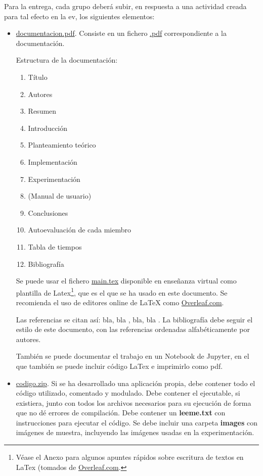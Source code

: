 \documentclass[a4paper]{article}
\begin{document}
Para la entrega, cada grupo deberá subir, en respuesta a una actividad creada para tal efecto en la ev, los siguientes elementos:

 \begin{itemize}
\item \url{documentacion.pdf}. Consiste en un fichero \url{.pdf} correspondiente a la documentación. 

Estructura de la documentación:

\begin{enumerate}
\item[]  Título
\item[]  Autores
\item[]  Resumen
\item  Introducción 
\item  Planteamiento teórico 
\item  Implementación
\item  Experimentación
\item  (Manual de usuario)
\item  Conclusiones
\item Autoevaluación de cada miembro
\item  Tabla de tiempos
\item[]  Bibliografía
\end{enumerate}

Se puede usar el fichero \url{main.tex} disponible en enseñanza virtual como plantilla de Latex\footnote{Véase el Anexo para algunos apuntes rápidos sobre escritura de textos en LaTex (tomados de \url{Overleaf.com}.}, que es el que se ha usado en este documento. Se recomienda el uso de editores online de LaTeX como \url{Overleaf.com}.

Las referencias se citan así:
bla, bla \cite{clave:revista}, bla, bla \cite{clave:libro}. La bibliografía
debe seguir el estilo de este documento, con las referencias ordenadas alfabéticamente por autores.

También se puede documentar el trabajo en un Notebook de Jupyter, en el que también se puede incluir código LaTex e imprimirlo como pdf.

\item \url{codigo.zip}. Si se ha desarrollado una aplicación propia, debe contener todo el código utilizado, comentado y modulado. Debe contener el ejecutable, si existiera, junto con todos los archivos necesarios para su ejecución de forma que no dé errores de compilación.
Debe contener un {\bf leeme.txt} con instrucciones para ejecutar el código.
Se debe incluir una carpeta \textbf{images} con imágenes de muestra, incluyendo las imágenes usadas en la experimentación.


\end{itemize}
\end{document}
